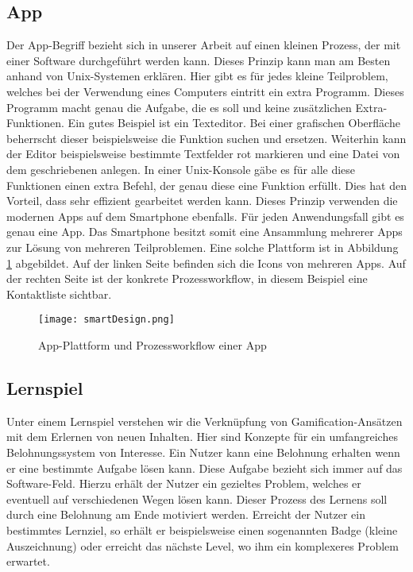 \subsection{App}
Der App-Begriff bezieht sich in unserer Arbeit auf einen kleinen Prozess, der mit einer Software durchgeführt werden kann. Dieses Prinzip kann man am Besten anhand von Unix-Systemen erklären. Hier gibt es für jedes kleine Teilproblem, welches bei der Verwendung eines Computers eintritt ein extra Programm. Dieses Programm macht genau die Aufgabe, die es soll und keine zusätzlichen Extra-Funktionen. Ein gutes Beispiel ist ein Texteditor. Bei einer grafischen Oberfläche beherrscht dieser beispielsweise die Funktion suchen und ersetzen. Weiterhin kann der Editor beispielsweise bestimmte Textfelder rot markieren und eine Datei von dem geschriebenen anlegen. In einer Unix-Konsole gäbe es für alle diese Funktionen einen extra Befehl, der genau diese eine Funktion erfüllt. Dies hat den Vorteil, dass sehr effizient gearbeitet werden kann. Dieses Prinzip verwenden die modernen Apps auf dem Smartphone ebenfalls. Für jeden Anwendungsfall gibt es genau eine App. Das Smartphone besitzt somit eine Ansammlung mehrerer Apps zur Lösung von mehreren Teilproblemen. Eine solche Plattform ist in Abbildung \ref{img1:smartDesign} abgebildet. Auf der linken Seite befinden sich die Icons von mehreren Apps. Auf der rechten Seite ist der konkrete Prozessworkflow, in diesem Beispiel eine Kontaktliste sichtbar. 
\begin{figure}[ht]
\begin{center}
\texttt{[image: smartDesign.png]}
\caption{App-Plattform und Prozessworkflow einer App}
\label{img1:smartDesign}
\end{center}
\end{figure} 

\subsection{Lernspiel}
Unter einem Lernspiel verstehen wir die Verknüpfung von Gamification-Ansätzen mit dem Erlernen von neuen Inhalten. Hier sind Konzepte für ein umfangreiches Belohnungssystem von Interesse. Ein Nutzer kann eine Belohnung erhalten wenn er eine bestimmte Aufgabe lösen kann. Diese Aufgabe bezieht sich immer auf das Software-Feld. Hierzu erhält der Nutzer ein gezieltes Problem, welches er eventuell auf verschiedenen Wegen lösen kann. Dieser Prozess des Lernens soll durch eine Belohnung am Ende motiviert werden. Erreicht der Nutzer ein bestimmtes Lernziel, so erhält er beispielsweise einen sogenannten Badge (kleine Auszeichnung) oder erreicht das nächste Level, wo ihm ein komplexeres Problem erwartet. 


